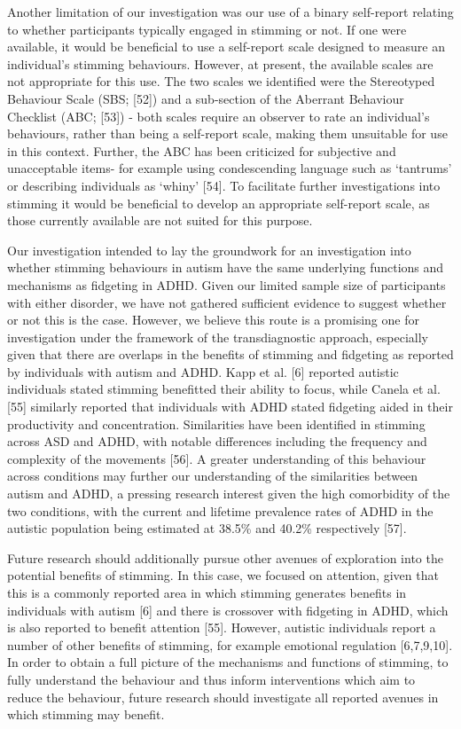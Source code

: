 \documentclass[
  letterpaper,
  DIV=11,
  numbers=noendperiod]{scrartcl}
\begin{document}
Another limitation of our investigation was our use of a binary
self-report relating to whether participants typically engaged in
stimming or not. If one were available, it would be beneficial to use a
self-report scale designed to measure an individual's stimming
behaviours. However, at present, the available scales are not
appropriate for this use. The two scales we identified were the
Stereotyped Behaviour Scale (SBS; {[}52{]}) and a sub-section of the
Aberrant Behaviour Checklist (ABC; {[}53{]}) - both scales require an
observer to rate an individual's behaviours, rather than being a
self-report scale, making them unsuitable for use in this context.
Further, the ABC has been criticized for subjective and unacceptable
items- for example using condescending language such as `tantrums' or
describing individuals as `whiny' {[}54{]}. To facilitate further
investigations into stimming it would be beneficial to develop an
appropriate self-report scale, as those currently available are not
suited for this purpose.

Our investigation intended to lay the groundwork for an investigation
into whether stimming behaviours in autism have the same underlying
functions and mechanisms as fidgeting in ADHD. Given our limited sample
size of participants with either disorder, we have not gathered
sufficient evidence to suggest whether or not this is the case. However,
we believe this route is a promising one for investigation under the
framework of the transdiagnostic approach, especially given that there
are overlaps in the benefits of stimming and fidgeting as reported by
individuals with autism and ADHD. Kapp et al. {[}6{]} reported autistic
individuals stated stimming benefitted their ability to focus, while
Canela et al. {[}55{]} similarly reported that individuals with ADHD
stated fidgeting aided in their productivity and concentration.
Similarities have been identified in stimming across ASD and ADHD, with
notable differences including the frequency and complexity of the
movements {[}56{]}. A greater understanding of this behaviour across
conditions may further our understanding of the similarities between
autism and ADHD, a pressing research interest given the high comorbidity
of the two conditions, with the current and lifetime prevalence rates of
ADHD in the autistic population being estimated at 38.5\% and 40.2\%
respectively {[}57{]}.

Future research should additionally pursue other avenues of exploration
into the potential benefits of stimming. In this case, we focused on
attention, given that this is a commonly reported area in which stimming
generates benefits in individuals with autism {[}6{]} and there is
crossover with fidgeting in ADHD, which is also reported to benefit
attention {[}55{]}. However, autistic individuals report a number of
other benefits of stimming, for example emotional regulation
{[}6,7,9,10{]}. In order to obtain a full picture of the mechanisms and
functions of stimming, to fully understand the behaviour and thus inform
interventions which aim to reduce the behaviour, future research should
investigate all reported avenues in which stimming may benefit.
\end{document}
